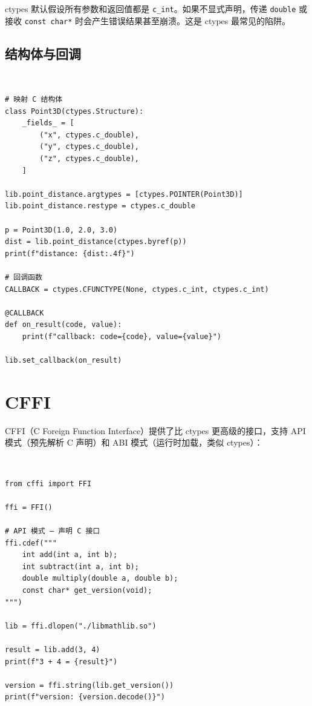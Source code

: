 \documentclass[12pt,a4paper,fontset=fandol]{ctexbook}
\newcommand{\pythonlabel}{%
  \begin{tcolorbox}[enhanced,colback=pythonheadbg,colframe=pythonheadbg,
    arc=1mm,boxrule=0mm,left=6pt,right=6pt,top=2pt,bottom=2pt,
    halign=left,oversize]
    \textcolor{white}{\small\bfseries Python}
  \end{tcolorbox}\vspace{-4pt}}
\newcommand{\Tp}[1]{\texttt{#1}}
\begin{document}
\begin{tcolorbox}[warning={必须声明 argtypes 和 restype}]
ctypes 默认假设所有参数和返回值都是 \Tp{c\_int}。如果不显式声明，传递 \Tp{double} 或接收 \Tp{const char*} 时会产生错误结果甚至崩溃。这是 ctypes 最常见的陷阱。
\end{tcolorbox}

\subsection{结构体与回调}

\pythonlabel
\begin{lstlisting}[style=pythonstyle]
# 映射 C 结构体
class Point3D(ctypes.Structure):
    _fields_ = [
        ("x", ctypes.c_double),
        ("y", ctypes.c_double),
        ("z", ctypes.c_double),
    ]

lib.point_distance.argtypes = [ctypes.POINTER(Point3D)]
lib.point_distance.restype = ctypes.c_double

p = Point3D(1.0, 2.0, 3.0)
dist = lib.point_distance(ctypes.byref(p))
print(f"distance: {dist:.4f}")

# 回调函数
CALLBACK = ctypes.CFUNCTYPE(None, ctypes.c_int, ctypes.c_int)

@CALLBACK
def on_result(code, value):
    print(f"callback: code={code}, value={value}")

lib.set_callback(on_result)
\end{lstlisting}

\section{CFFI}

CFFI（C Foreign Function Interface）提供了比 ctypes 更高级的接口，支持 API 模式（预先解析 C 声明）和 ABI 模式（运行时加载，类似 ctypes）：

\pythonlabel
\begin{lstlisting}[style=pythonstyle]
from cffi import FFI

ffi = FFI()

# API 模式 — 声明 C 接口
ffi.cdef("""
    int add(int a, int b);
    int subtract(int a, int b);
    double multiply(double a, double b);
    const char* get_version(void);
""")

lib = ffi.dlopen("./libmathlib.so")

result = lib.add(3, 4)
print(f"3 + 4 = {result}")

version = ffi.string(lib.get_version())
print(f"version: {version.decode()}")
\end{lstlisting}
\end{document}
